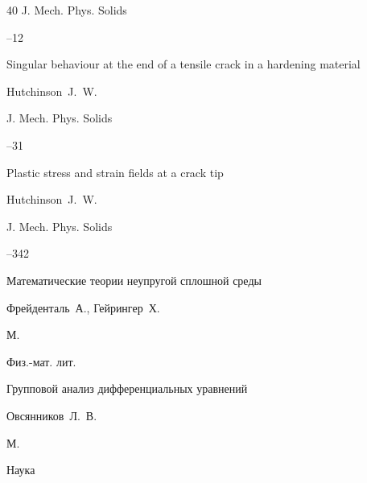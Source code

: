 \begin{thebibliography}{40}
\jour J. Mech. Phys. Solids




--12





\paper Singular behaviour at the end of a tensile crack in a hardening material

\by    Hutchinson~J.~W.

\jour J. Mech. Phys. Solids




--31





\paper Plastic stress and strain fields at a crack tip

\by    Hutchinson~J.~W.

\jour J. Mech. Phys. Solids




--342





\book Математические теории неупругой сплошной среды

\by Фрейденталь~А., Гейрингер~Х.

\publaddr М.

\publ Физ.-мат. лит.






\book Групповой анализ дифференциальных уравнений

\by Овсянников~Л.~В.

\publaddr М.

\publ Наука






\end{thebibliography}
